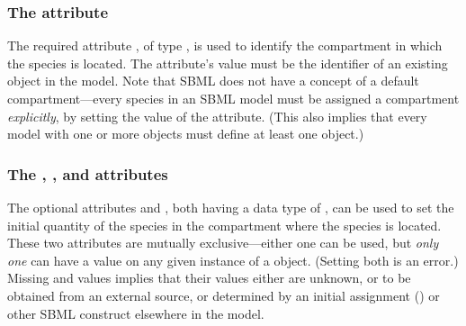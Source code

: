 \subsubsection{The  attribute}
\label{sec:species-compartment}

The required attribute , of type
, is used to identify the compartment in which
the species is located.  The attribute's value must be the
identifier of an existing \Compartment object in the model.  Note
that SBML does not have a concept of a default compartment---every
species in an SBML model must be assigned a compartment
\emph{explicitly}, by setting the value of the 
attribute.  (This also implies that every model with one or more
\Species objects must define at least one \Compartment object.)


\subsubsection{The ,
  , and  attributes}
\label{sec:initialAmount}
\label{sec:species-substanceunits}

The optional attributes  and
, both having a data type of
, can be used to set the initial quantity of the
species in the compartment where the species is located.  These
two attributes are mutually exclusive---either one can be used,
but \emph{only one} can have a value on any given instance of a
\Species object.  (Setting both is an error.)
Missing  and
 values implies that their values
either are unknown, or to be obtained from an external source, or
determined by an initial assignment
() or other SBML construct
elsewhere in the model.

